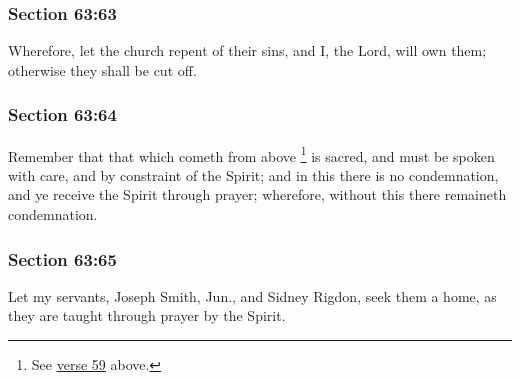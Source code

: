 	\subsubsection{Section 63:63} %
		\label{DC63-63}

		Wherefore, let the church repent of their sins, and I, the Lord, will own them; otherwise they shall be cut off.


	\subsubsection{Section 63:64} %
		\label{DC63-64}

		Remember that that which cometh from above%
			\footnote{%
				See \hyperref[DC63-59]{verse 59} above.
				}
		is sacred, and must be spoken with care, and by constraint of the Spirit; and in this there is no condemnation, and ye receive the Spirit through prayer; wherefore, without this there remaineth condemnation.


	\subsubsection{Section 63:65} %
		\label{DC63-65}

		Let my servants, Joseph Smith, Jun., and Sidney Rigdon, seek them a home, as they are taught through prayer by the Spirit.


